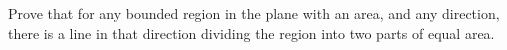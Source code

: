 Prove that for any bounded region in the plane with an area, and any direction, there is a line in that direction dividing the region into two parts of equal area.
